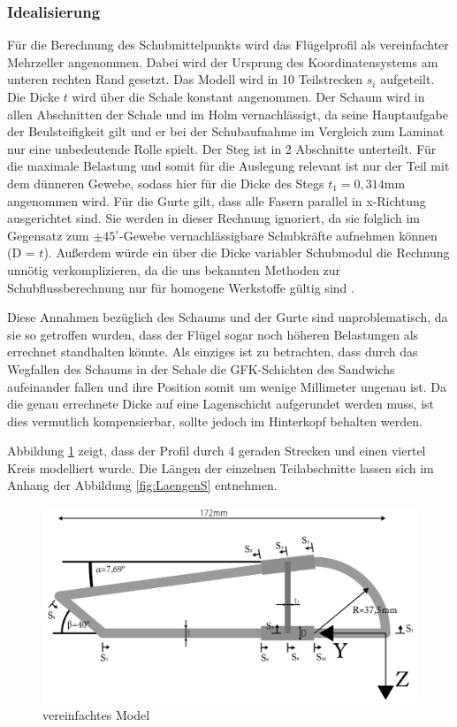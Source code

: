 \subsubsection{Idealisierung}
Für die Berechnung des Schubmittelpunkts wird das Flügelprofil als vereinfachter Mehrzeller angenommen.
Dabei wird der Ursprung des Koordinatensystems am unteren rechten Rand gesetzt. Das Modell wird in 10 Teilstrecken $s_{i}$ aufgeteilt. Die Dicke $t$ wird über die Schale konstant angenommen. Der Schaum wird in allen Abschnitten der Schale und im Holm vernachlässigt, da seine Hauptaufgabe der Beulsteifigkeit gilt und er bei der Schubaufnahme im Vergleich zum Laminat nur eine unbedeutende Rolle spielt. Der Steg ist in 2 Abschnitte unterteilt. Für die maximale Belastung und somit für die Auslegung relevant ist nur der Teil mit dem dünneren Gewebe, sodass hier für die Dicke des Stegs $t_{1}=0,314\mathrm{mm}$ angenommen wird. Für die Gurte gilt, dass alle Fasern parallel in x-Richtung ausgerichtet sind. Sie werden in dieser Rechnung ignoriert, da sie folglich im Gegensatz zum $\pm45^\circ$-Gewebe vernachlässigbare Schubkräfte aufnehmen können (D = $t$). Außerdem würde ein über die Dicke variabler Schubmodul die Rechnung unnötig verkomplizieren, da die uns bekannten Methoden zur Schubflussberechnung nur für homogene Werkstoffe gültig sind \cite{item15}.

Diese Annahmen bezüglich des Schaums und der Gurte sind unproblematisch, da sie so getroffen wurden, dass der Flügel sogar noch höheren Belastungen als errechnet standhalten könnte. Als einziges ist zu betrachten, dass durch das Wegfallen des Schaums in der Schale die GFK-Schichten des Sandwichs aufeinander fallen und ihre Position somit um wenige Millimeter ungenau ist. Da die genau errechnete Dicke auf eine Lagenschicht aufgerundet werden muss, ist dies vermutlich kompensierbar, sollte jedoch im Hinterkopf behalten werden.

Abbildung \ref{Fluegel1} zeigt, dass der Profil durch 4 geraden Strecken und einen viertel Kreis modelliert wurde. Die Längen der einzelnen Teilabschnitte lassen sich im Anhang der Abbildung \ref{fig:LaengenS} entnehmen.
\begin{figure}[h]
 \centering
 \includegraphics[width=1\textwidth]{Bilder/Model1}
 \caption{vereinfachtes Model}
 \label{Fluegel1}
\end{figure}
